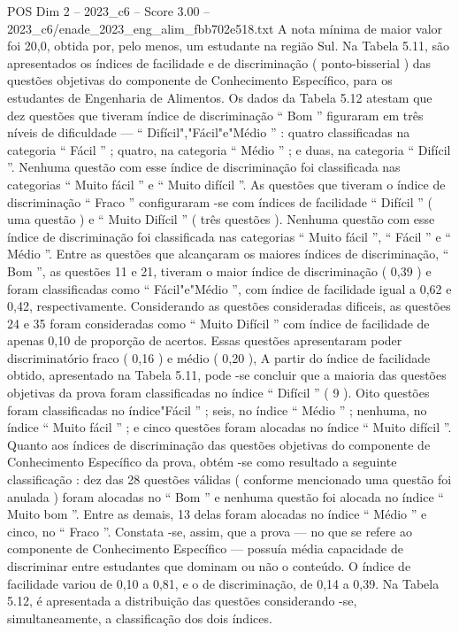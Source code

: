\begin{textsample}{POS Dim 2 – 2023\_c6 – Score 3.00 – 2023\_c6/enade\_2023\_eng\_alim\_fbb702e518.txt}
A nota mínima de maior valor foi 20,0, obtida por, pelo menos, um estudante na região Sul.
Na Tabela 5.11, são apresentados os índices de facilidade e de discriminação ( ponto-bisserial ) das questões objetivas do componente de Conhecimento Específico, para os estudantes de Engenharia de Alimentos.
Os dados da Tabela 5.12 atestam que dez questões que tiveram índice de discriminação “ Bom ” figuraram em três níveis de dificuldade — “ Difícil","Fácil"e"Médio ” : quatro classificadas na categoria “ Fácil ” ; quatro, na categoria “ Médio ” ; e duas, na categoria “ Difícil ”.
Nenhuma questão com esse índice de discriminação foi classificada nas categorias “ Muito fácil ” e “ Muito difícil ”.
As questões que tiveram o índice de discriminação “ Fraco ” configuraram -se com índices de facilidade “ Difícil ” ( uma questão ) e “ Muito Difícil ” ( três questões ).
Nenhuma questão com esse índice de discriminação foi classificada nas categorias “ Muito fácil ”, “ Fácil ” e “ Médio ”.
Entre as questões que alcançaram os maiores índices de discriminação, “ Bom ”, as questões 11 e 21, tiveram o maior índice de discriminação ( 0,39 ) e foram classificadas como “ Fácil"e"Médio ”, com índice de facilidade igual a 0,62 e 0,42, respectivamente.
Considerando as questões consideradas dificeis, as questões 24 e 35 foram consideradas como “ Muito Difícil ” com índice de facilidade de apenas 0,10 de proporção de acertos.
Essas questões apresentaram poder discriminatório fraco ( 0,16 ) e médio ( 0,20 ), A partir do índice de facilidade obtido, apresentado na Tabela 5.11, pode -se concluir que a maioria das questões objetivas da prova foram classificadas no índice “ Difícil ” ( 9 ).
Oito questões foram classificadas no índice"Fácil ” ; seis, no índice “ Médio ” ; nenhuma, no índice “ Muito fácil ” ; e cinco questões foram alocadas no índice “ Muito difícil ”.
Quanto aos índices de discriminação das questões objetivas do componente de Conhecimento Específico da prova, obtém -se como resultado a seguinte classificação : dez das 28 questões válidas ( conforme mencionado uma questão foi anulada ) foram alocadas no “ Bom ” e nenhuma questão foi alocada no índice “ Muito bom ”.
Entre as demais, 13 delas foram alocadas no índice “ Médio ” e cinco, no “ Fraco ”.
Constata -se, assim, que a prova — no que se refere ao componente de Conhecimento Específico — possuía média capacidade de discriminar entre estudantes que dominam ou não o conteúdo.
O índice de facilidade variou de 0,10 a 0,81, e o de discriminação, de 0,14 a 0,39.
Na Tabela 5.12, é apresentada a distribuição das questões considerando -se, simultaneamente, a classificação dos dois índices.

\end{textsample}
